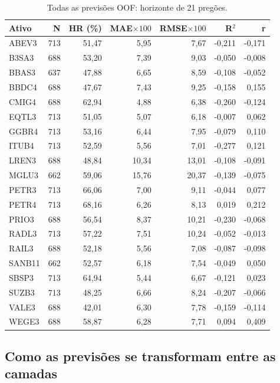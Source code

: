\begin{table}[H]\centering
\caption{Todas as previsões OOF: horizonte de 21 pregões.}
{\footnotesize\begin{tabular}{lrrrrrr}\hline
Ativo & N & HR (\%) & MAE$\times100$ & RMSE$\times100$ & R$^2$ & r\\ \hline
ABEV3 & 713 & 51,47 & 5,95 & 7,67 & -0,211 & -0,171\\
B3SA3 & 688 & 53,20 & 7,39 & 9,03 & -0,050 & -0,008\\
BBAS3 & 637 & 47,88 & 6,65 & 8,59 & -0,108 & -0,052\\
BBDC4 & 688 & 47,67 & 7,43 & 9,25 & -0,158 & 0,155\\
CMIG4 & 688 & 62,94 & 4,88 & 6,38 & -0,260 & -0,124\\
EQTL3 & 713 & 51,05 & 5,07 & 6,18 & -0,007 & 0,062\\
GGBR4 & 713 & 53,16 & 6,44 & 7,95 & -0,079 & 0,110\\
ITUB4 & 713 & 52,59 & 5,56 & 7,01 & -0,277 & 0,121\\
LREN3 & 688 & 48,84 & 10,34 & 13,01 & -0,108 & -0,091\\
MGLU3 & 662 & 59,06 & 15,76 & 20,37 & -0,139 & -0,075\\
PETR3 & 713 & 66,06 & 7,00 & 9,11 & -0,044 & 0,077\\
PETR4 & 713 & 68,16 & 6,26 & 8,13 & 0,019 & 0,212\\
PRIO3 & 688 & 56,54 & 8,37 & 10,21 & -0,230 & -0,068\\
RADL3 & 713 & 57,22 & 7,51 & 10,24 & -0,052 & -0,013\\
RAIL3 & 688 & 52,18 & 5,56 & 7,08 & -0,087 & -0,098\\
SANB11 & 662 & 52,57 & 6,18 & 7,54 & -0,049 & 0,050\\
SBSP3 & 713 & 64,94 & 5,44 & 6,67 & -0,121 & 0,023\\
SUZB3 & 713 & 48,25 & 6,66 & 8,24 & -0,207 & -0,066\\
VALE3 & 688 & 42,01 & 6,30 & 7,78 & -0,159 & -0,114\\
WEGE3 & 688 & 58,87 & 6,28 & 7,71 & 0,094 & 0,409\\
\hline\end{tabular}}\par{}\end{table}

\subsection{Como as previsões se transformam entre as camadas}

